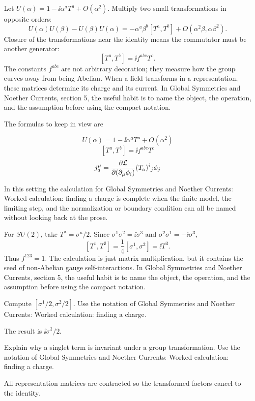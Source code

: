 Let \(U(\alpha)=1-\ii\alpha^aT^a+O(\alpha^2)\).  Multiply two small transformations in opposite orders:
\[
  U(\alpha)U(\beta)-U(\beta)U(\alpha)
  =
  -\alpha^a\beta^b[T^a,T^b]+O(\alpha^2\beta,\alpha\beta^2).
\]
Closure of the transformations near the identity means the commutator must be another generator:
\[
  [T^a,T^b]=\ii f^{abc}T^c.
\]
The constants \(f^{abc}\) are not arbitrary decoration; they measure how the group curves away from being Abelian.  When a field transforms in a representation, these matrices determine its charge and its current.  In Global Symmetries and Noether Currents, section 5, the useful habit is to name the object, the operation, and the assumption before using the compact notation.

The formulas to keep in view are

\[
  U(\alpha)=1-\ii\alpha^aT^a+O(\alpha^2)
\]
\[
  [T^a,T^b]=\ii f^{abc}T^c
\]
\[
  j^\mu_a=\frac{\partial\mathcal L}{\partial(\partial_\mu\phi_i)}(T_a)^i{}_j\phi_j
\]

In this setting the calculation for Global Symmetries and Noether Currents: Worked calculation: finding a charge is complete when the finite model, the limiting step, and the normalization or boundary condition can all be named without looking back at the prose.




\begin{example}
For \(SU(2)\), take \(T^a=\sigma^a/2\).  Since \(\sigma^1\sigma^2=\ii\sigma^3\) and \(\sigma^2\sigma^1=-\ii\sigma^3\),
\[
  [T^1,T^2]=\frac14[\sigma^1,\sigma^2]=\ii T^3.
\]
Thus \(f^{123}=1\).  The calculation is just matrix multiplication, but it contains the seed of non-Abelian gauge self-interactions.  In Global Symmetries and Noether Currents, section 5, the useful habit is to name the object, the operation, and the assumption before using the compact notation.
\end{example}



\begin{exercise}
Compute \([\sigma^1/2,\sigma^2/2]\).  Use the notation of Global Symmetries and Noether Currents: Worked calculation: finding a charge.
\begin{answer}
The result is \(\ii\sigma^3/2\).
\end{answer}
\end{exercise}

\begin{exercise}
Explain why a singlet term is invariant under a group transformation.  Use the notation of Global Symmetries and Noether Currents: Worked calculation: finding a charge.
\begin{answer}
All representation matrices are contracted so the transformed factors cancel to the identity.
\end{answer}
\end{exercise}



